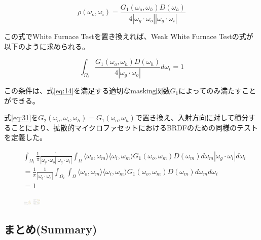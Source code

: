 \documentclass[a4j,xelatex,ja=standard]{bxjsarticle}
\begin{document}
\begin{equation}
    \rho(\omega_o, \omega_i) = \frac{G_1(\omega_o, \omega_h) D(\omega_h)}{4|\omega_g \cdot \omega_o| |\omega_g \cdot \omega_i|}
    \label{eq:35}
\end{equation}

この式でWhite Furnace Testを置き換えれば、Weak White Furnace Testの式が以下のように求められる。

\begin{equation}
    \boxed{
    \int_{\Omega_i} \frac{G_1(\omega_o, \omega_h) D(\omega_h)}{4|\omega_g \cdot \omega_o|} d\omega_i = 1
    }
    \label{eq:36}
\end{equation}

この条件は、式\eqref{eq:14}を満足する適切なmasking関数$G_1$によってのみ満たすことができる。

式\eqref{eq:31}を$G_2(\omega_o, \omega_i, \omega_h) = G_1(\omega_o, \omega_h)$で置き換え、入射方向に対して積分することにより、拡散的マイクロファセットにおけるBRDFのための同様のテストを定義した。

\begin{equation}
    \begin{split}
        & \int_{\Omega_i} \frac{1}{\pi} \frac{1}{|\omega_g \cdot \omega_o| |\omega_g \cdot \omega_i|} \int_{\Omega} \langle \omega_o, \omega_m \rangle \langle \omega_i, \omega_m \rangle G_1(\omega_o, \omega_m) D(\omega_m) d\omega_m |\omega_g \cdot \omega_i| d\omega_i \\
        &= \frac{1}{\pi} \frac{1}{|\omega_g \cdot \omega_o|} \int_{\Omega_i} \int_{\Omega} \langle \omega_o, \omega_m \rangle \langle \omega_i, \omega_m \rangle G_1(\omega_o, \omega_m) D(\omega_m) d\omega_m d\omega_i \\
        &= 1
    \end{split}
    \label{eq:37}
\end{equation}

\begin{figure}
    \includegraphics[width=10pt]{Figure6_1.png}
    \includegraphics[width=10pt]{Figure6_2.png}
    \caption{}
    \label{fig:6}
\end{figure}

\subsection{まとめ(Summary)}
\end{document}
